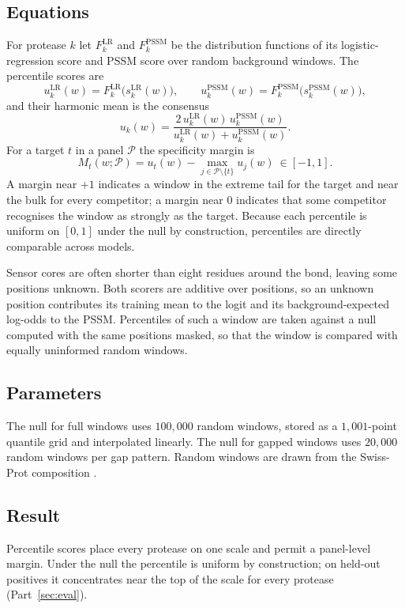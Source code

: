 \subsection{Equations}

For protease $k$ let $F_k^{\mathrm{LR}}$ and $F_k^{\mathrm{PSSM}}$ be the
distribution functions of its logistic-regression score and PSSM score over
random background windows. The percentile scores are
\begin{equation}
u_k^{\mathrm{LR}}(w)=F_k^{\mathrm{LR}}\bigl(s_k^{\mathrm{LR}}(w)\bigr),\qquad
u_k^{\mathrm{PSSM}}(w)=F_k^{\mathrm{PSSM}}\bigl(s_k^{\mathrm{PSSM}}(w)\bigr),
\label{eq:pct}
\end{equation}
and their harmonic mean is the consensus
\begin{equation}
u_k(w)=\frac{2\,u_k^{\mathrm{LR}}(w)\,u_k^{\mathrm{PSSM}}(w)}{u_k^{\mathrm{LR}}(w)+u_k^{\mathrm{PSSM}}(w)}.
\label{eq:cons}
\end{equation}
For a target $t$ in a panel $\mathcal{P}$ the specificity margin is
\begin{equation}
M_t(w;\mathcal{P})=u_t(w)-\max_{j\in\mathcal{P}\setminus\{t\}}u_j(w)\ \in[-1,1].
\label{eq:margin}
\end{equation}
A margin near $+1$ indicates a window in the extreme tail for the target and
near the bulk for every competitor; a margin near $0$ indicates that some
competitor recognises the window as strongly as the target. Because each percentile is uniform on $[0,1]$ under the null by construction, percentiles are directly comparable across models.

Sensor cores are often shorter than eight residues around the bond, leaving
some positions unknown. Both scorers are additive over positions, so an unknown position contributes
its training mean to the logit and its background-expected log-odds to the PSSM. Percentiles of such a window are taken
against a null computed with the same positions masked, so that the window is
compared with equally uninformed random windows.

\subsection{Parameters}

The null for full windows uses $100{,}000$ random windows, stored as a
$1{,}001$-point quantile grid and interpolated linearly. The null for gapped
windows uses $20{,}000$ random windows per gap pattern. Random windows are drawn
from the Swiss-Prot composition .

\subsection{Result}

Percentile scores place every protease on one scale and permit a panel-level
margin. Under the null the percentile is uniform by construction; on held-out
positives it concentrates near the top of the scale for every protease
(Part~\ref{sec:eval}).
